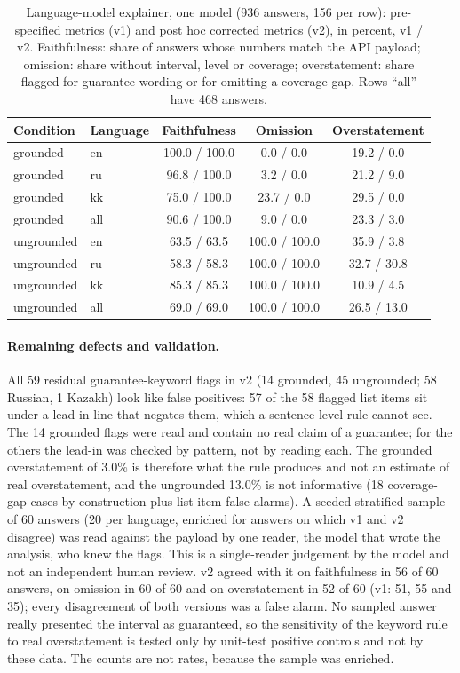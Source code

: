 \begin{table}[t]
\centering
\caption{Language-model explainer, one model (936 answers, 156 per row): pre-specified metrics (v1) and post hoc corrected metrics (v2), in percent, v1 / v2. Faithfulness: share of answers whose numbers match the API payload; omission: share without interval, level or coverage; overstatement: share flagged for guarantee wording or for omitting a coverage gap. Rows ``all'' have 468 answers.}
\label{tab:explainer}
\small
\begin{tabular}{@{}llccc@{}}
\toprule
Condition & Language & Faithfulness & Omission & Overstatement \\
\midrule
grounded & en & 100.0 / 100.0 & 0.0 / 0.0 & 19.2 / 0.0 \\
grounded & ru & 96.8 / 100.0 & 3.2 / 0.0 & 21.2 / 9.0 \\
grounded & kk & 75.0 / 100.0 & 23.7 / 0.0 & 29.5 / 0.0 \\
grounded & all & 90.6 / 100.0 & 9.0 / 0.0 & 23.3 / 3.0 \\
ungrounded & en & 63.5 / 63.5 & 100.0 / 100.0 & 35.9 / 3.8 \\
ungrounded & ru & 58.3 / 58.3 & 100.0 / 100.0 & 32.7 / 30.8 \\
ungrounded & kk & 85.3 / 85.3 & 100.0 / 100.0 & 10.9 / 4.5 \\
ungrounded & all & 69.0 / 69.0 & 100.0 / 100.0 & 26.5 / 13.0 \\
\bottomrule
\end{tabular}
\end{table}

\paragraph{Remaining defects and validation.} All 59 residual guarantee-keyword flags in v2 (14 grounded, 45 ungrounded; 58 Russian, 1 Kazakh) look like false positives: 57 of the 58 flagged list items sit under a lead-in line that negates them, which a sentence-level rule cannot see. The 14 grounded flags were read and contain no real claim of a guarantee; for the others the lead-in was checked by pattern, not by reading each. The grounded overstatement of 3.0\% is therefore what the rule produces and not an estimate of real overstatement, and the ungrounded 13.0\% is not informative (18 coverage-gap cases by construction plus list-item false alarms). A seeded stratified sample of 60 answers (20 per language, enriched for answers on which v1 and v2 disagree) was read against the payload by one reader, the model that wrote the analysis, who knew the flags. This is a single-reader judgement by the model and not an independent human review. v2 agreed with it on faithfulness in 56 of 60 answers, on omission in 60 of 60 and on overstatement in 52 of 60 (v1: 51, 55 and 35); every disagreement of both versions was a false alarm. No sampled answer really presented the interval as guaranteed, so the sensitivity of the keyword rule to real overstatement is tested only by unit-test positive controls and not by these data. The counts are not rates, because the sample was enriched.


